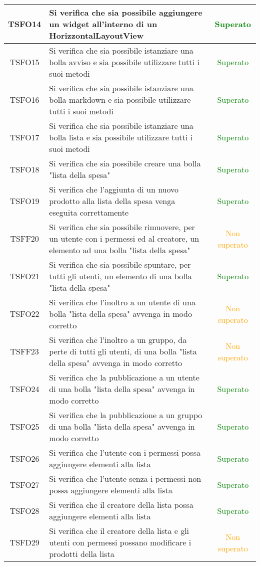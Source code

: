 \begin{center}
\begin{longtable}{|c|>{\centering}m{10cm}|c|}
		TSFO14 & Si verifica che sia possibile aggiungere un widget all'interno di un HorizzontalLayoutView & \textcolor{Green}{Superato}\\ \hline
		TSFO15 & Si verifica che sia possibile istanziare una bolla avviso e sia possibile utilizzare tutti i suoi metodi & \textcolor{Green}{Superato}\\ \hline
		TSFO16 & Si verifica che sia possibile istanziare una bolla markdown e sia possibile utilizzare tutti i suoi metodi & \textcolor{Green}{Superato}\\ \hline
		TSFO17 & Si verifica che sia possibile istanziare una bolla lista e sia possibile utilizzare tutti i suoi metodi & \textcolor{Green}{Superato}\\ \hline
		TSFO18 & Si verifica che sia possibile creare una bolla "lista della spesa" & \textcolor{Green}{Superato}\\ \hline
		TSFO19 & Si verifica che l'aggiunta di un nuovo prodotto alla lista della spesa venga eseguita correttamente & \textcolor{Green}{Superato}\\ \hline
		TSFF20 & Si verifica che sia possibile rimuovere, per un utente con i permessi ed al creatore, un elemento ad una bolla "lista della spesa" & \textcolor{Orange}{Non superato}\\ \hline
		TSFO21 & Si verifica che sia possibile spuntare, per tutti gli utenti, un elemento di una bolla "lista della spesa" & \textcolor{Green}{Superato}\\ \hline
		TSFO22 & Si verifica che l'inoltro a un utente di una bolla "lista della spesa" avvenga in modo corretto & \textcolor{Orange}{Non superato}\\ \hline
		TSFF23 & Si verifica che l'inoltro a un gruppo, da perte di tutti gli utenti, di una bolla "lista della spesa" avvenga in modo corretto & \textcolor{Orange}{Non superato}\\ \hline
		TSFO24 & Si verifica che la pubblicazione a un utente di una bolla "lista della spesa" avvenga in modo corretto & \textcolor{Green}{Superato}\\ \hline
		TSFO25 & Si verifica che la pubblicazione a un gruppo di una bolla "lista della spesa" avvenga in modo corretto & \textcolor{Green}{Superato}\\ \hline
		TSFO26 & Si verifica che l'utente con i permessi possa aggiungere elementi alla lista & \textcolor{Green}{Superato}\\ \hline
		TSFO27 & Si verifica che l'utente senza i permessi non possa aggiungere elementi alla lista & \textcolor{Green}{Superato}\\ \hline
		TSFO28 & Si verifica che il creatore della lista possa aggiungere elementi alla lista & \textcolor{Green}{Superato}\\ \hline
		TSFD29 & Si verifica che il creatore della lista e gli utenti con permessi possano modificare i prodotti della lista & \textcolor{Orange}{Non superato}\\ \hline
	\end{longtable}
\end{center}
